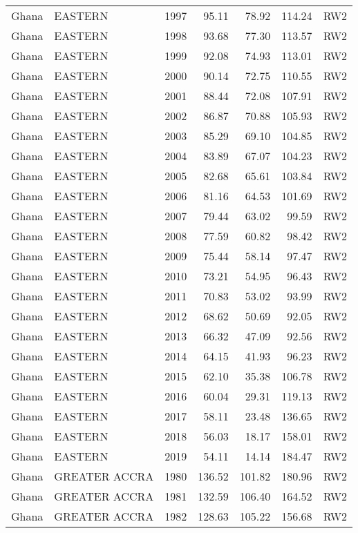 \begin{longtable}{lllrrrl}
  Ghana & EASTERN & 1997 & 95.11 & 78.92 & 114.24 & RW2 \\ 
  Ghana & EASTERN & 1998 & 93.68 & 77.30 & 113.57 & RW2 \\ 
  Ghana & EASTERN & 1999 & 92.08 & 74.93 & 113.01 & RW2 \\ 
  Ghana & EASTERN & 2000 & 90.14 & 72.75 & 110.55 & RW2 \\ 
  Ghana & EASTERN & 2001 & 88.44 & 72.08 & 107.91 & RW2 \\ 
  Ghana & EASTERN & 2002 & 86.87 & 70.88 & 105.93 & RW2 \\ 
  Ghana & EASTERN & 2003 & 85.29 & 69.10 & 104.85 & RW2 \\ 
  Ghana & EASTERN & 2004 & 83.89 & 67.07 & 104.23 & RW2 \\ 
  Ghana & EASTERN & 2005 & 82.68 & 65.61 & 103.84 & RW2 \\ 
  Ghana & EASTERN & 2006 & 81.16 & 64.53 & 101.69 & RW2 \\ 
  Ghana & EASTERN & 2007 & 79.44 & 63.02 & 99.59 & RW2 \\ 
  Ghana & EASTERN & 2008 & 77.59 & 60.82 & 98.42 & RW2 \\ 
  Ghana & EASTERN & 2009 & 75.44 & 58.14 & 97.47 & RW2 \\ 
  Ghana & EASTERN & 2010 & 73.21 & 54.95 & 96.43 & RW2 \\ 
  Ghana & EASTERN & 2011 & 70.83 & 53.02 & 93.99 & RW2 \\ 
  Ghana & EASTERN & 2012 & 68.62 & 50.69 & 92.05 & RW2 \\ 
  Ghana & EASTERN & 2013 & 66.32 & 47.09 & 92.56 & RW2 \\ 
  Ghana & EASTERN & 2014 & 64.15 & 41.93 & 96.23 & RW2 \\ 
  Ghana & EASTERN & 2015 & 62.10 & 35.38 & 106.78 & RW2 \\ 
  Ghana & EASTERN & 2016 & 60.04 & 29.31 & 119.13 & RW2 \\ 
  Ghana & EASTERN & 2017 & 58.11 & 23.48 & 136.65 & RW2 \\ 
  Ghana & EASTERN & 2018 & 56.03 & 18.17 & 158.01 & RW2 \\ 
  Ghana & EASTERN & 2019 & 54.11 & 14.14 & 184.47 & RW2 \\ 
  Ghana & GREATER ACCRA & 1980 & 136.52 & 101.82 & 180.96 & RW2 \\ 
  Ghana & GREATER ACCRA & 1981 & 132.59 & 106.40 & 164.52 & RW2 \\ 
  Ghana & GREATER ACCRA & 1982 & 128.63 & 105.22 & 156.68 & RW2 \\ 

\end{longtable}
